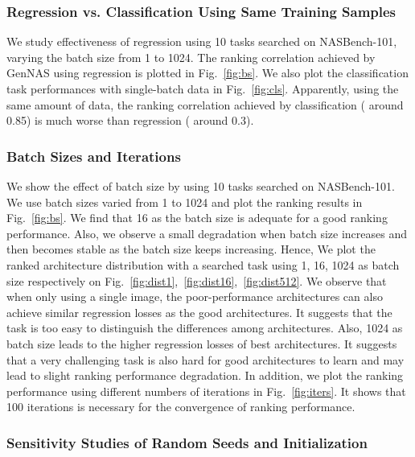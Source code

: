 \documentclass{article}
\begin{document}
\subsubsection{Regression vs. Classification Using Same Training Samples}
We study effectiveness of regression using 10 tasks searched on NASBench-101, varying the batch size from 1 to 1024. The ranking correlation achieved by GenNAS using regression is plotted in Fig.~\ref{fig:bs}.
We also plot the classification task performances with single-batch data in Fig.~\ref{fig:cls}.
Apparently, using the same amount of data, the ranking correlation achieved by classification ( around 0.85) is much worse than regression ( around 0.3). 


\subsubsection{Batch Sizes and Iterations}

We show the effect of batch size by using 10 tasks searched on NASBench-101. We use batch sizes varied from 1 to 1024 and plot the ranking results in Fig.~\ref{fig:bs}. We find that 16 as the batch size is adequate for a good ranking performance. Also, we observe a small degradation when batch size increases and then becomes stable as the batch size keeps increasing. Hence, We plot the ranked architecture distribution with a searched task using 1, 16, 1024 as batch size respectively on Fig.~\ref{fig:dist1},~\ref{fig:dist16},~\ref{fig:dist512}. We observe that when only using a single image, the poor-performance architectures can also achieve similar regression losses as the good architectures. It suggests that the task is too easy to distinguish the differences among architectures. Also, 1024 as batch size leads to the higher regression losses of best architectures. It suggests that a very challenging task is also hard for good architectures to learn and may lead to slight ranking performance degradation. In addition, we plot the ranking performance using different numbers of iterations in Fig.~\ref{fig:iters}. It shows that 100 iterations is necessary for the convergence of ranking performance. 


\subsubsection{Sensitivity Studies of Random Seeds and Initialization}
\end{document}
